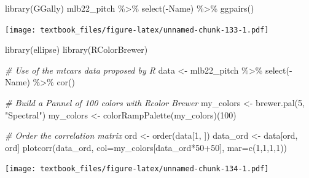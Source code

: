 \documentclass[
  11pt,
]{book}
\newenvironment{Shaded}{\begin{snugshade}}{\end{snugshade}}
\newcommand{\AttributeTok}[1]{\textcolor[rgb]{0.77,0.63,0.00}{#1}}
\newcommand{\CommentTok}[1]{\textcolor[rgb]{0.56,0.35,0.01}{\textit{#1}}}
\newcommand{\DecValTok}[1]{\textcolor[rgb]{0.00,0.00,0.81}{#1}}
\newcommand{\FunctionTok}[1]{\textcolor[rgb]{0.00,0.00,0.00}{#1}}
\newcommand{\NormalTok}[1]{#1}
\newcommand{\OtherTok}[1]{\textcolor[rgb]{0.56,0.35,0.01}{#1}}
\newcommand{\SpecialCharTok}[1]{\textcolor[rgb]{0.00,0.00,0.00}{#1}}
\newcommand{\StringTok}[1]{\textcolor[rgb]{0.31,0.60,0.02}{#1}}
\theoremstyle{definition}
\theoremstyle{definition}
\theoremstyle{definition}
\theoremstyle{definition}
\theoremstyle{remark}
\begin{document}
\begin{Shaded}
\begin{Highlighting}[]
\FunctionTok{library}\NormalTok{(GGally)}
\NormalTok{mlb22\_pitch }\SpecialCharTok{\%\textgreater{}\%} \FunctionTok{select}\NormalTok{(}\SpecialCharTok{{-}}\NormalTok{Name) }\SpecialCharTok{\%\textgreater{}\%} \FunctionTok{ggpairs}\NormalTok{()}
\end{Highlighting}
\end{Shaded}

\texttt{[image: textbook\_files/figure-latex/unnamed-chunk-133-1.pdf]}

\newpage

\begin{Shaded}
\begin{Highlighting}[]
\FunctionTok{library}\NormalTok{(ellipse)}
\FunctionTok{library}\NormalTok{(RColorBrewer)}

\CommentTok{\# Use of the mtcars data proposed by R}
\NormalTok{data }\OtherTok{\textless{}{-}}\NormalTok{ mlb22\_pitch }\SpecialCharTok{\%\textgreater{}\%} \FunctionTok{select}\NormalTok{(}\SpecialCharTok{{-}}\NormalTok{Name) }\SpecialCharTok{\%\textgreater{}\%} \FunctionTok{cor}\NormalTok{()}

\CommentTok{\# Build a Pannel of 100 colors with Rcolor Brewer}
\NormalTok{my\_colors }\OtherTok{\textless{}{-}} \FunctionTok{brewer.pal}\NormalTok{(}\DecValTok{5}\NormalTok{, }\StringTok{"Spectral"}\NormalTok{)}
\NormalTok{my\_colors }\OtherTok{\textless{}{-}} \FunctionTok{colorRampPalette}\NormalTok{(my\_colors)(}\DecValTok{100}\NormalTok{)}

\CommentTok{\# Order the correlation matrix}
\NormalTok{ord }\OtherTok{\textless{}{-}} \FunctionTok{order}\NormalTok{(data[}\DecValTok{1}\NormalTok{, ])}
\NormalTok{data\_ord }\OtherTok{\textless{}{-}}\NormalTok{ data[ord, ord]}
\FunctionTok{plotcorr}\NormalTok{(data\_ord, }\AttributeTok{col=}\NormalTok{my\_colors[data\_ord}\SpecialCharTok{*}\DecValTok{50}\SpecialCharTok{+}\DecValTok{50}\NormalTok{], }\AttributeTok{mar=}\FunctionTok{c}\NormalTok{(}\DecValTok{1}\NormalTok{,}\DecValTok{1}\NormalTok{,}\DecValTok{1}\NormalTok{,}\DecValTok{1}\NormalTok{))}
\end{Highlighting}
\end{Shaded}

\texttt{[image: textbook\_files/figure-latex/unnamed-chunk-134-1.pdf]}

\newpage
\end{document}
